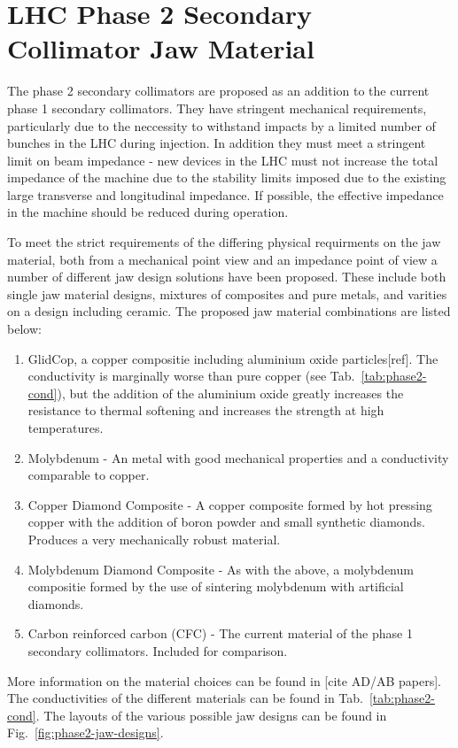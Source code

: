 \section{LHC Phase 2 Secondary Collimator Jaw Material}

The phase 2 secondary collimators are proposed as an addition to the current phase 1 secondary collimators. They have stringent mechanical requirements, particularly due to the neccessity to withstand impacts by a limited number of bunches in the LHC during injection. In addition they must meet a stringent limit on beam impedance - new devices in the LHC must not increase the total impedance of the machine due to the stability limits imposed due to the existing large transverse and longitudinal impedance. If possible, the effective impedance in the machine should be reduced during operation. 

To meet the strict requirements of the differing physical requirments on the jaw material, both from a mechanical point view and an impedance point of view a number of different jaw design solutions have been proposed. These include both single jaw material designs, mixtures of composites and pure metals, and varities on a design including ceramic. The proposed jaw material combinations are listed below:

\begin{enumerate}
\item{GlidCop, a copper compositie including aluminium oxide particles[ref]. The conductivity is marginally worse than pure copper (see Tab.~\ref{tab:phase2-cond}), but the addition of the aluminium oxide greatly increases the resistance to thermal softening and increases the strength at high temperatures.}
\item{Molybdenum - An metal with good mechanical properties and a conductivity comparable to copper.}
\item{Copper Diamond Composite - A copper composite formed by hot pressing copper with the addition of boron powder and small synthetic diamonds. Produces a very mechanically robust material.}
\item{Molybdenum Diamond Composite - As with the above, a molybdenum compositie formed by the use of sintering molybdenum with artificial diamonds.}
\item{Carbon reinforced carbon (CFC) - The current material of the phase 1 secondary collimators. Included for comparison.}
\end{enumerate}

More information on the material choices can be found in [cite AD/AB papers]. The conductivities of the different materials can be found in Tab.~\ref{tab:phase2-cond}. The layouts of the various possible jaw designs can be found in Fig.~\ref{fig:phase2-jaw-designs}.

